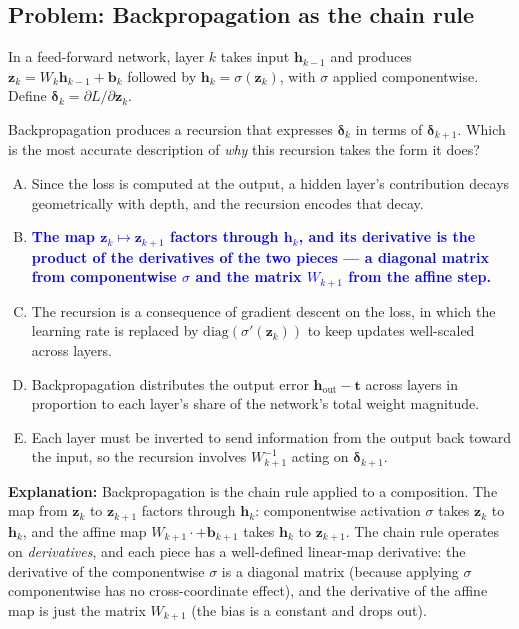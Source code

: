 \documentclass[12pt]{amsart}
\begin{document}
\subsection*{Problem: Backpropagation as the chain rule}

In a feed-forward network, layer $k$ takes input $\mathbf{h}_{k-1}$ and
produces $\mathbf{z}_k = W_k \mathbf{h}_{k-1} + \mathbf{b}_k$ followed by
$\mathbf{h}_k = \sigma(\mathbf{z}_k)$, with $\sigma$ applied componentwise.
Define $\boldsymbol{\delta}_k = \partial L / \partial \mathbf{z}_k$.

Backpropagation produces a recursion that expresses $\boldsymbol{\delta}_k$
in terms of $\boldsymbol{\delta}_{k+1}$. Which is the most accurate
description of \emph{why} this recursion takes the form it does?

\begin{enumerate}[(A)]
\item Since the loss is computed at the output, a hidden layer's contribution decays geometrically with depth, and the recursion encodes that decay.
\item \textcolor{blue}{\textbf{The map $\mathbf{z}_k \mapsto \mathbf{z}_{k+1}$ factors through $\mathbf{h}_k$, and its derivative is the product of the derivatives of the two pieces --- a diagonal matrix from componentwise $\sigma$ and the matrix $W_{k+1}$ from the affine step.}}
\item The recursion is a consequence of gradient descent on the loss, in which the learning rate is replaced by $\mathrm{diag}(\sigma'(\mathbf{z}_k))$ to keep updates well-scaled across layers.
\item Backpropagation distributes the output error $\mathbf{h}_{\text{out}} - \mathbf{t}$ across layers in proportion to each layer's share of the network's total weight magnitude.
\item Each layer must be inverted to send information from the output back toward the input, so the recursion involves $W_{k+1}^{-1}$ acting on $\boldsymbol{\delta}_{k+1}$.
\end{enumerate}

\textbf{Explanation:}
Backpropagation is the chain rule applied to a composition. The map from
$\mathbf{z}_k$ to $\mathbf{z}_{k+1}$ factors through $\mathbf{h}_k$:
componentwise activation $\sigma$ takes $\mathbf{z}_k$ to $\mathbf{h}_k$,
and the affine map $W_{k+1} \cdot + \mathbf{b}_{k+1}$ takes $\mathbf{h}_k$
to $\mathbf{z}_{k+1}$. The chain rule operates on \emph{derivatives}, and
each piece has a well-defined linear-map derivative: the derivative of the
componentwise $\sigma$ is a diagonal matrix (because applying $\sigma$
componentwise has no cross-coordinate effect), and the derivative of the
affine map is just the matrix $W_{k+1}$ (the bias is a constant and drops out).
\end{document}
